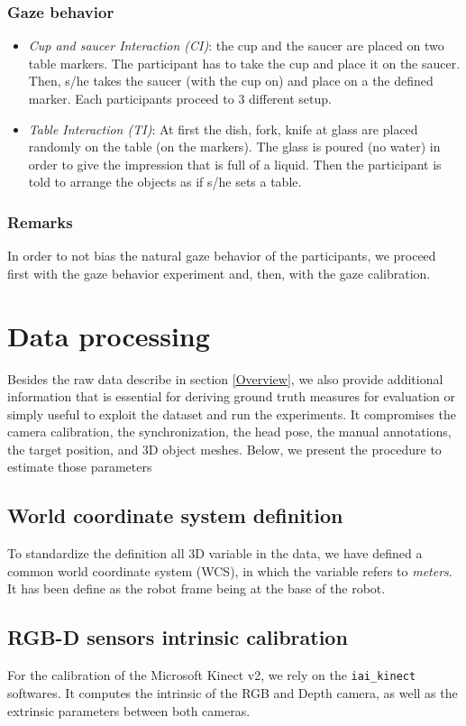 \documentclass[11pt,a4paper]{article}
\begin{document}
\subsubsection{Gaze behavior}
\begin{itemize}
\item \textit{Cup and saucer Interaction (CI)}: the cup and the saucer are placed on two table markers. The participant has to take the cup and place it on the saucer. Then, s/he takes the saucer (with the cup on) and place on a the defined marker. Each participants proceed to 3 different setup.
\item \textit{Table Interaction (TI)}: At first the dish, fork, knife at glass are placed randomly on the table (on the markers). The glass is poured (no water) in order to give the impression that is full of a liquid. Then the participant is told to arrange the objects as if s/he sets a table.
\end{itemize}

\subsubsection{Remarks}
In order to not bias the natural gaze behavior of the participants, we proceed first with the gaze behavior experiment and, then, with the gaze calibration.

\section{Data processing}
Besides the raw data describe in section \ref{Overview}, we also provide additional information that is essential for deriving ground truth measures for evaluation or simply useful to exploit the dataset and run the experiments. It compromises the camera calibration, the synchronization, the head pose, the manual annotations, the target position, and 3D object meshes. Below, we present the procedure to estimate those parameters

\subsection{World coordinate system definition}
To standardize the definition all 3D variable in the data, we have defined a common world coordinate system (WCS), in which the variable refers to \textit{meters}. It has been define as the robot frame being at the base of the robot.

\subsection{RGB-D sensors intrinsic calibration}
For the calibration of the Microsoft Kinect v2, we rely on the \texttt{iai\_kinect} softwares. It computes the intrinsic of the RGB and Depth camera, as well as the extrinsic parameters between both cameras.
\end{document}
